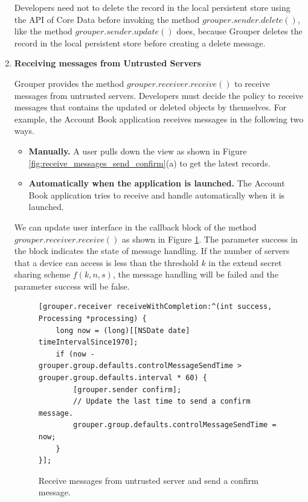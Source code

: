 \documentclass[a4paper,11pt]{report}
\begin{document}
\begin{enumerate}
Developers need not to delete the record in the local persistent store using the API of Core Data before invoking the method $grouper.sender.delete()$,  like the method $grouper.sender.update()$ does, because Grouper deletes the record in the local persistent store before creating a delete message.
\\

\item \textbf{Receiving messages from Untrusted Servers}

Grouper provides the method $grouper.receiver.receive()$ to receive messages from untrusted servers.
Developers must decide the policy to receive messages that contains the updated or deleted objects by themselves.
For example, the Account Book application receives messages in the following two ways.

\begin{itemize}[leftmargin=7mm]
	\setlength{\itemsep}{1pt}
	\setlength{\parskip}{0pt}
	\setlength{\parsep}{0pt}
	\item \textbf{Manually.}
	A user pulls down the view as shown in Figure \ref{fig:receive_messages_send_confirm}(a) to get the latest records.
	\item \textbf{Automatically when the application is launched.} 
	The Account Book application tries to receive and handle automatically when it is launched.
\end{itemize}

We can update user interface in the callback block of the method $grouper.receiver.receive()$ as shown in Figure \ref{fig:receive_with_completion}.
The parameter success in the block indicates the state of message handling.
If the number of servers that a device can access is less than the threshold $k$ in the extend secret sharing scheme $f(k, n, s)$, the message handling will be failed and the parameter success will be false.

\begin{figure}
\begin{lstlisting}[frame=none language=Objective-C] 
[grouper.receiver receiveWithCompletion:^(int success, Processing *processing) {
    long now = (long)[[NSDate date] timeIntervalSince1970];
    if (now - grouper.group.defaults.controlMessageSendTime > grouper.group.defaults.interval * 60) {
        [grouper.sender confirm];
        // Update the last time to send a confirm message.
        grouper.group.defaults.controlMessageSendTime = now;
    }
}];
\end{lstlisting}
\caption{Receive messages from untrusted server and send a confirm message.}
\label{fig:receive_with_completion}
\end{figure}


\end{enumerate}
\end{document}
